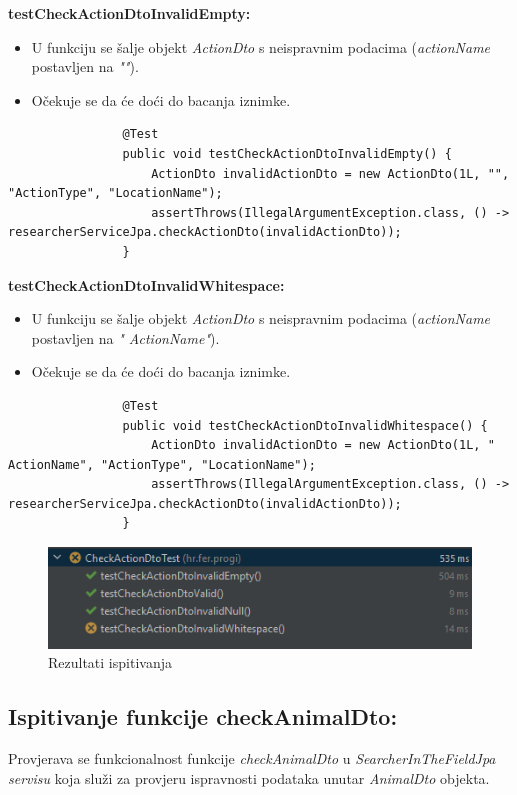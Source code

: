 			\textbf{testCheckActionDtoInvalidEmpty:}
			\begin{itemize}
				\item U funkciju se šalje objekt \textit{ActionDto} s neispravnim podacima (\textit{actionName} postavljen na \textit{""}).
				\item Očekuje se da će doći do bacanja iznimke.
			\end{itemize}
			\begin{lstlisting}
				@Test
				public void testCheckActionDtoInvalidEmpty() {
					ActionDto invalidActionDto = new ActionDto(1L, "", "ActionType", "LocationName");
					assertThrows(IllegalArgumentException.class, () -> researcherServiceJpa.checkActionDto(invalidActionDto));
				}
			\end{lstlisting}
			
			\textbf{testCheckActionDtoInvalidWhitespace:}
			\begin{itemize}
				\item U funkciju se šalje objekt \textit{ActionDto} s neispravnim podacima (\textit{actionName} postavljen na \textit{" ActionName"}).
				\item Očekuje se da će doći do bacanja iznimke.
			\end{itemize}
			\begin{lstlisting}
				@Test
				public void testCheckActionDtoInvalidWhitespace() {
					ActionDto invalidActionDto = new ActionDto(1L, " ActionName", "ActionType", "LocationName");
					assertThrows(IllegalArgumentException.class, () -> researcherServiceJpa.checkActionDto(invalidActionDto));
				}
			\end{lstlisting}
			
			\begin{figure}[H]
				\includegraphics[scale=1]{slike/checkActionDtoTest.png} 
				\centering
				\caption{Rezultati ispitivanja}
				\label{fig:promjene}
			\end{figure}
			
			\subsection{Ispitivanje funkcije checkAnimalDto:}
			Provjerava se funkcionalnost funkcije \textit{checkAnimalDto} u \textit{SearcherInTheFieldJpa servisu} koja služi za provjeru ispravnosti podataka unutar \textit{AnimalDto} objekta.
			

